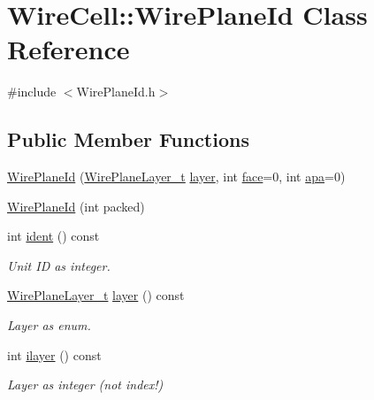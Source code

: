 \hypertarget{class_wire_cell_1_1_wire_plane_id}{}\section{Wire\+Cell\+:\+:Wire\+Plane\+Id Class Reference}
\label{class_wire_cell_1_1_wire_plane_id}


{\ttfamily \#include $<$Wire\+Plane\+Id.\+h$>$}

\subsection*{Public Member Functions}
\begin{DoxyCompactItemize}
\item 
\hyperlink{class_wire_cell_1_1_wire_plane_id_ad98e6c304a687aea61232e5c6c108ba9}{Wire\+Plane\+Id} (\hyperlink{namespace_wire_cell_a761397ff086f0a7e1a1d9ccd251ac618}{Wire\+Plane\+Layer\+\_\+t} \hyperlink{class_wire_cell_1_1_wire_plane_id_a203ede27a759b00518be11b8d23776fd}{layer}, int \hyperlink{class_wire_cell_1_1_wire_plane_id_a18de55bd3637c1586db6ab9e5f39da18}{face}=0, int \hyperlink{class_wire_cell_1_1_wire_plane_id_a868dff2296e2531a30732a0528054be2}{apa}=0)
\item 
\hyperlink{class_wire_cell_1_1_wire_plane_id_a24c2311e0872adaad69aebac4eb83270}{Wire\+Plane\+Id} (int packed)
\item 
int \hyperlink{class_wire_cell_1_1_wire_plane_id_adff770cfb3d3ddfa42ff55dbbb5cf0b9}{ident} () const
\begin{DoxyCompactList}\small\item\em Unit ID as integer. \end{DoxyCompactList}\item 
\hyperlink{namespace_wire_cell_a761397ff086f0a7e1a1d9ccd251ac618}{Wire\+Plane\+Layer\+\_\+t} \hyperlink{class_wire_cell_1_1_wire_plane_id_a203ede27a759b00518be11b8d23776fd}{layer} () const
\begin{DoxyCompactList}\small\item\em Layer as enum. \end{DoxyCompactList}\item 
int \hyperlink{class_wire_cell_1_1_wire_plane_id_a33a565cfc76f84e9bc103b1ca33d0974}{ilayer} () const
\begin{DoxyCompactList}\small\item\em Layer as integer (not index!) \end{DoxyCompactList}\item 

\end{DoxyCompactItemize}
